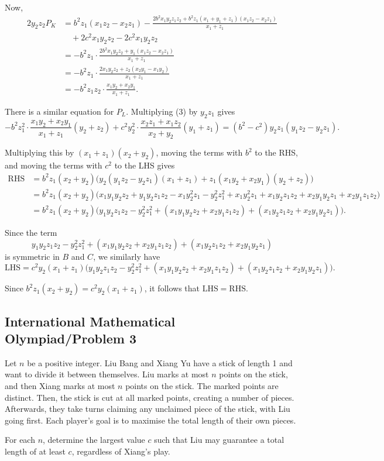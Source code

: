 \documentclass[11pt]{article}
\begin{document}
\noindent Now,
\begin{align*}
2y_2z_2P_K &= b^2z_1(x_1z_2-x_2z_1) - \frac{2b^2x_1y_2z_1z_2 + b^2z_1(x_1+y_1+z_1)(x_1z_2-x_2z_1)}{x_1+z_1} \\
&\quad + 2c^2x_1y_2z_2 - 2c^2x_1y_2z_2 \\
&= -b^2z_1 \cdot \frac{2b^2x_1y_2z_2 + y_1(x_1z_2-x_2z_1)}{x_1+z_1} \\
&= -b^2z_1 \cdot \frac{2x_1y_2z_2 + z_2(x_2y_1-x_1y_2)}{x_1+z_1} \\
&= -b^2z_1z_2 \cdot \frac{x_1y_2+x_2y_1}{x_1+z_1}.
\end{align*}

\noindent There is a similar equation for $P_L$. Multiplying (3) by $y_2z_1$ gives
\[
-b^2z_1^2 \cdot \frac{x_1y_2+x_2y_1}{x_1+z_1}(y_2+z_2) + c^2y_2^2 \cdot \frac{x_2z_1+x_1z_2}{x_2+y_2}(y_1+z_1) = (b^2-c^2)y_2z_1(y_1z_2-y_2z_1).
\]

\noindent Multiplying this by $(x_1+z_1)(x_2+y_2)$, moving the terms with $b^2$ to the RHS, and moving the terms with $c^2$ to the LHS gives
\begin{align*}
\mathrm{RHS} &= b^2z_1(x_2+y_2) \Big( y_2(y_1z_2-y_2z_1)(x_1+z_1) + z_1(x_1y_2+x_2y_1)(y_2+z_2) \Big) \\
&= b^2z_1(x_2+y_2) \Big( x_1y_1y_2z_2 + y_1y_2z_1z_2 - x_1y_2^2z_1 - y_2^2z_1^2 + x_1y_2^2z_1 + x_1y_2z_1z_2 + x_2y_1y_2z_1 + x_2y_1z_1z_2 \Big) \\
&= b^2z_1(x_2+y_2) \Big( y_1y_2z_1z_2 - y_2^2z_1^2 + (x_1y_1y_2z_2 + x_2y_1z_1z_2) + (x_1y_2z_1z_2 + x_2y_1y_2z_1) \Big).
\end{align*}

\noindent Since the term
\[
y_1y_2z_1z_2 - y_2^2z_1^2 + (x_1y_1y_2z_2 + x_2y_1z_1z_2) + (x_1y_2z_1z_2 + x_2y_1y_2z_1)
\]
is symmetric in $B$ and $C$, we similarly have
\[
\mathrm{LHS} = c^2y_2(x_1+z_1) \Big( y_1y_2z_1z_2 - y_2^2z_1^2 + (x_1y_1y_2z_2 + x_2y_1z_1z_2) + (x_1y_2z_1z_2 + x_2y_1y_2z_1) \Big).
\]

\noindent Since $b^2z_1(x_2+y_2) = c^2y_2(x_1+z_1)$, it follows that $\mathrm{LHS} = \mathrm{RHS}$. 

\newpage
\subsection{International Mathematical Olympiad/Problem 3}
\begin{problem*}
    Let $n$ be a positive integer. Liu Bang and Xiang Yu have a stick of length 1 and want to divide it between themselves. Liu marks at most $n$ points on the stick, and then Xiang marks at most $n$ points on the stick. The marked points are distinct. Then, the stick is cut at all marked points, creating a number of pieces. Afterwards, they take turns claiming any unclaimed piece of the stick, with Liu going first. Each player's goal is to maximise the total length of their own pieces.

\medskip
\noindent
For each $n$, determine the largest value $c$ such that Liu may guarantee a total length of at least $c$, regardless of Xiang's play.
\end{problem*}
\end{document}
